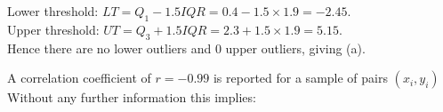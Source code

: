\documentclass[bigtut]{tutorial}
\begin{document}
\begin{tutorial}
\begin{questions}

\begin{solution}
Lower threshold: $LT = Q_{1} - 1.5 IQR = 0.4 - 1.5 \times 1.9 = -2.45$. \\
Upper threshold: $UT = Q_{3} + 1.5 IQR = 2.3 + 1.5 \times 1.9 = 5.15$. \\
Hence there are no lower outliers and 0 upper outliers, giving (a).
\end{solution}

\question
A correlation coefficient of $r=-0.99$ is reported for a sample of pairs $(x_{i}, y_{i})$
Without any further information this implies:

\end{questions}
\end{tutorial}
\end{document}
